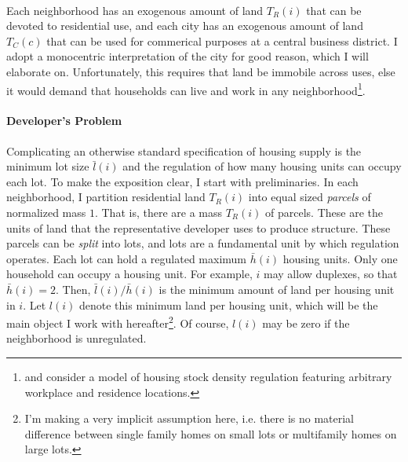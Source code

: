 \documentclass[]{article}
\begin{document}
\paragraph*{}
Each neighborhood has an exogenous amount of land $T_{R}(i)$ that can be devoted to residential use, and each city has an exogenous amount of land $T_{C}(c)$ that can be used for commerical purposes at a central business district. I adopt a monocentric interpretation of the city for good reason, which I will elaborate on. Unfortunately, this requires that land be immobile across uses, else it would demand that households can live and work in any neighborhood\footnote{\cite{acosta} and \cite{martynov} consider a model of housing stock density regulation featuring arbitrary workplace and residence locations.}. 

\paragraph*{Developer's Problem}   
Complicating an otherwise standard specification of housing supply is the minimum lot size $\bar{l}(i)$ and the regulation of how many housing units can occupy each lot. To make the exposition clear, I start with preliminaries. In each neighborhood, I partition residential land $T_{R}(i)$ into equal sized \textit{parcels} of normalized mass $1$. That is, there are a mass $T_{R}(i)$ of parcels. These are the units of land that the representative developer uses to produce structure. These parcels can be \textit{split} into lots, and lots are a fundamental unit by which regulation operates. Each lot can hold a regulated maximum $\bar{h}(i)$ housing units. Only one household can occupy a housing unit. For example, $i$ may allow duplexes, so that $\bar{h}(i) = 2$. Then, $\bar{l}(i)/\bar{h}(i)$ is the minimum amount of land per housing unit in $i$. Let $l(i)$ denote this minimum land per housing unit, which will be the main object I work with hereafter\footnote{I'm making a very implicit assumption here, i.e. there is no material difference between single family homes on small lots or multifamily homes on large lots.}. Of course, $l(i)$ may be zero if the neighborhood is unregulated. 
\end{document}
